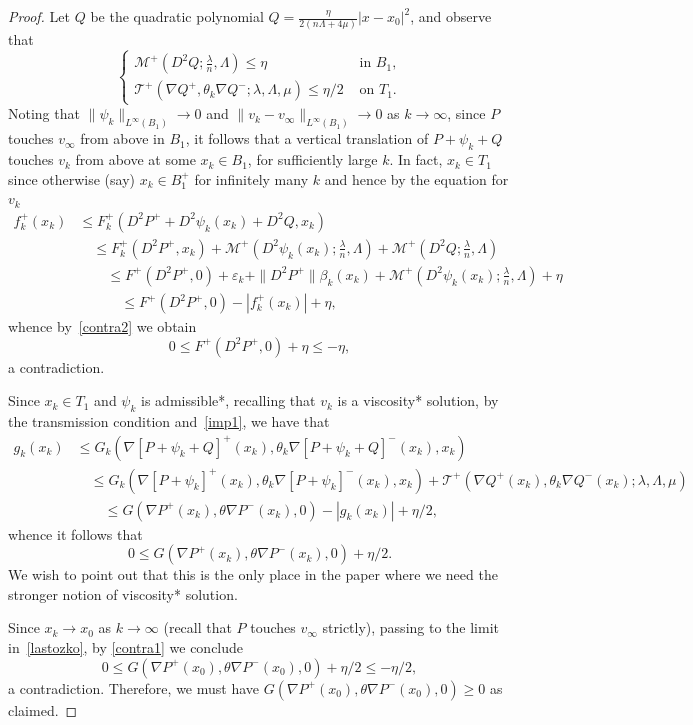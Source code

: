 \documentclass[letter,11pt]{amsart}
\newcommand{\vep}{\varepsilon}
\newcommand{\mcal}{\mathcal{M}}
\newcommand{\tcal}{\mathcal{T}}
\theoremstyle{definition}
\numberwithin{equation}{section}
\begin{document}
\begin{proof}
Let $Q$ be the quadratic polynomial $Q = \frac{\eta}{2(n \Lambda + 4 \mu)}|x- x_0|^2$, and observe that
\[
\begin{cases}
\mcal^{+}(D^2 Q; \frac{\lambda}{n}, \Lambda) \leq \eta & \text{ in } B_1,\\
\tcal^{+}(\nabla Q^{+}, \theta_k \nabla Q^{-}; \lambda, \Lambda, \mu) \leq \eta/2 & \text{ on } T_1.
\end{cases}
\]
Noting that $\|\psi_k\|_{L^{\infty}(B_1)} \to 0$ and $\|v_k - v_{\infty}\|_{L^{\infty}(B_1)} \to 0$ as $k \to \infty$, since $P$ touches $v_{\infty}$ from above in $B_1$, it follows that a vertical translation of $P + \psi_k + Q$ touches $v_{k}$ from above at some $x_k \in B_1$, for sufficiently large $k$.
In fact, $x_k \in T_1$ since otherwise (say) $x_k \in B_1^{+}$ for infinitely many $k$ and hence by the equation for $v_k$
\[
\begin{split}
f^{+}_k(x_k) &
\textstyle
\leq F_k^{+}(D^2 P^{+} + D^2 \psi_k(x_k) + D^2 Q, x_k)\\
& \quad \leq F_k^{+}(D^2 P^{+}, x_k) 
+ \textstyle \mcal^{+}(D^2 \psi_k(x_k); \frac{\lambda}{n}, \Lambda) + \mcal^{+}(D^2 Q; \frac{\lambda}{n}, \Lambda)\\
& \qquad \leq F^{+}(D^2 P^{+}, 0) + \vep_k + \|D^2 P^{+}\| \beta_k(x_k) + \textstyle \mcal^{+}(D^2 \psi_k(x_k); \frac{\lambda}{n}, \Lambda) + \eta\\
& \qquad \quad \leq F^{+}(D^2 P^{+}, 0) - |f_k^{+}(x_k)| +\textstyle \eta,
\end{split}
\]
whence by~\eqref{contra2} we obtain
\[
0 \leq F^{+}(D^2 P^{+}, 0) + \eta \leq - \eta,
\]
a contradiction.

\medskip

Since $x_k \in T_1$ and $\psi_k$ is admissible*, recalling that $v_k$ is a viscosity* solution, by the transmission condition and~\eqref{imp1}, we have that
\[
\begin{split}
g_k(x_k) &
\textstyle
\leq G_k(\nabla [P + \psi_k + Q]^{+}(x_k), \theta_k \nabla [P + \psi_k + Q]^{-}(x_k), x_k)\\
&
\textstyle
\quad \leq G_k(\nabla[P+\psi_k]^{+}(x_k), \theta_k \nabla[P+\psi_k]^{-}(x_k),x_k) + \tcal^{+}(\nabla Q^{+}(x_k), \theta_k \nabla Q^{-}(x_k); \lambda, \Lambda, \mu)\\
& \qquad \leq G(\nabla P^{+}(x_k), \theta \nabla P^{-}(x_k), 0) - |g_k(x_k) | + \eta/2,
\end{split}
\]
whence it follows that
\begin{equation}
\label{lastozko}
0 \leq G(\nabla P^{+}(x_k), \theta \nabla P^{-}(x_k), 0) + \eta/2.
\end{equation}
We wish to point out that this is the only place in the paper where we need the stronger notion of viscosity* solution.

\medskip

Since $x_k \to x_0$ as $k \to \infty$ (recall that $P$ touches $v_{\infty}$ strictly), passing to the limit in~\eqref{lastozko}, by \eqref{contra1} we conclude
\[
0 \leq G(\nabla P^{+}(x_0), \theta \nabla P^{-}(x_0), 0) + \eta/2 \leq - \eta/2,
\]
a contradiction.
Therefore, we must have $G(\nabla P^{+}(x_0), \theta \nabla P^{-}(x_0), 0) \geq 0$ as claimed.
\end{proof}
\end{document}
